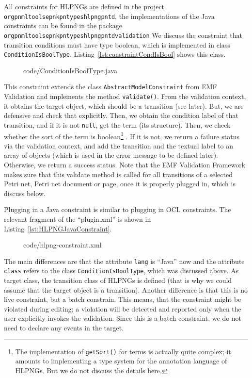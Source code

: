 All constraints for HLPNGs are defined in the project
{\tt
org\qnsep{}pnml\qnsep{}tools\qnsep{}epnk\qnsep{}pntypes\qnsep{}hlpng\qnsep{}pntd},
the implementations of the Java constraints can be found in the package
{\tt org\qnsep{}pnml\qnsep{}tools\qnsep{}epnk\qnsep{}pntypes\qnsep{}hlpng\qnsep{}pntd\qnsep{}validation}
We discuss the constraint that transition conditions must have type boolean,
which is implemented in class {\tt ConditionIsBoolType}.
Listing~\ref{lst:constraintCondIsBool} shows this class.
%
\begin{figure}[htbp!]
%
{code/ConditionIsBoolType.java}
\end{figure}
%
This constraint extends the class {\tt AbstractModel\optsep{}Constraint}%
from EMF Validation and implements the method {\tt validate()}.%
From the validation context, it obtains the target object, which should be a
transition (see later). But, we are defensive and check that explicitly. Then, we
obtain the condition label of that transition, and if it is not {\tt null},
get the term (its structure). Then, we check whether the sort of
the term is boolean\footnote
 {The implementation of {\tt getSort()} for terms is actually quite
  complex; it amounts to implementing a type system for the
  annotation language of HLPNGs. But we do not discuss the details here.}%
. If it is not, we return a failure status via the validation context,
and add the transition and the textual label to an array of objects
(which is used in the error message to be defined later). Otherwise,
we return a success status. Note that the EMF Validation Framework
makes sure that this validate method is called for all transitions
of a selected Petri net, Petri net document or page, once it is
properly plugged in, which is discuss below.

Plugging in a Java constraint is similar to plugging in
OCL constraints. The relevant fragment of the ``plugin.xml''
is shown in Listing~\ref{lst:HLPNGJavaConstraint}.
%
\begin{figure}[htbp!]
%
  {code/hlpng-constraint.xml}
\end{figure}
%
The main differences are that the attribute {\tt lang} is ``Java''
now and the attribute {\tt class} refers to the class {\tt ConditionIsBoolType},
which was discussed above. As target class, the transition class of
HLPNGs is defined (that is why we could assume that the target
object is a transition). Another difference is that this is no live constraint,
but a batch constrain. This means, that the constraint might be violated during
editing; a violation will be detected and reported only when the user
explicitly invokes the validation.
Since this is a batch constraint, we do not need to declare any events in
the target.

